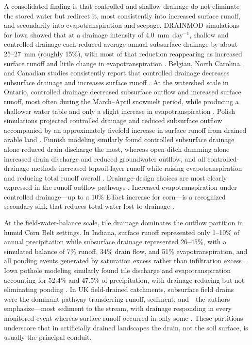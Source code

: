 A consolidated finding is that controlled and shallow drainage do not eliminate
the stored water but redirect it, most consistently into increased surface
runoff, and secondarily into evapotranspiration and seepage. DRAINMOD
simulations for Iowa showed that at a drainage intensity of 4.0~mm~day$^{-1}$,
shallow and controlled drainage each reduced average annual subsurface drainage
by about 25--27~mm (roughly 15\%), with most of that reduction reappearing as
increased surface runoff and little change in evapotranspiration
\parencite{Singh2007b}. Belgian, North Carolina, and Canadian studies
consistently report that controlled drainage decreases subsurface drainage and
increases surface runoff \parencite{ElSadek2002,ElSadek2002b,DEAL1986,Skaggs1995,Golmohammadi2016,Ndulue2024}.
At the watershed scale in Ontario, controlled drainage decreased subsurface
outflow and increased surface runoff, most often during the March--April
snowmelt period, while producing a shallower water table and only a slight
increase in evapotranspiration \parencite{Golmohammadi2016}. Polish simulations
projected controlled drainage and reduced subsurface outflow accompanied by an
approximately fivefold increase in surface runoff from drained arable land
\parencite{Sojka2020}. Finnish modeling similarly found controlled subsurface
drainage alone reduced drain discharge the most, whereas open-ditch damming
alone increased drain discharge and reduced groundwater outflow, and all
controlled-drainage methods increased topsoil-layer runoff while raising
evapotranspiration and reducing total runoff overall
\parencite{Isomäki2024}. Drainage-design choices are most clearly expressed in
the runoff outflow pathways \parencite{Isomäki2024}. Increased evapotranspiration
under controlled drainage---up to a 10\% ETact increase for corn---is a
recognized secondary sink that reduces total water lost to drainage
\parencite{deWit2022,DEAL1986,Ndulue2024}.

At the field-water-balance scale, tile drainage dominates the outflow partition
in humid Corn Belt settings. In Indiana, surface runoff represented only 1--10\%
of annual precipitation while subsurface drainage represented 26--45\%, with a
simulated balance of 7\% runoff, 34\% drain flow, and 51\% evapotranspiration,
and all ponding events generated by saturation excess rather than infiltration
excess \parencite{Saadat2020}. Iowa pothole modeling similarly found tile
discharge and evapotranspiration accounting for 52.4\% and 47.5\% of
precipitation, with drainage reducing but not eliminating ponding
\parencite{Amado2018,Martin2019}. In UK field-drained catchments, subsurface
field drains were the dominant pathway transferring runoff, sediment, and---the
authors emphasize---most sediment to the stream, with drainage responding in
every monitored event whereas surface runoff occurred in only some
\parencite{Deasy2009}. These partitions underscore that in artificially drained
landscapes the drain, not the soil surface, is usually the principal conduit.

